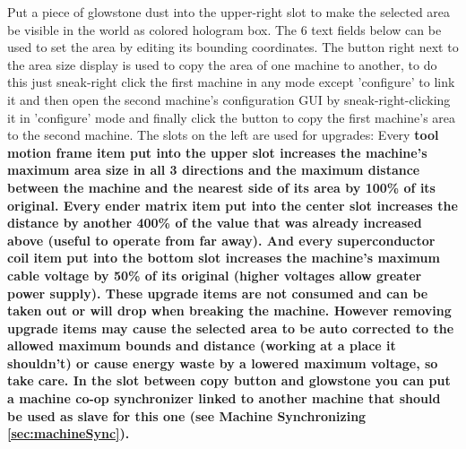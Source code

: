 \documentclass[11pt]{article} %
\begin{document}
Put a piece of glowstone dust into the upper-right slot to make the selected area be visible in the world as colored hologram box. The 6 text fields below can be used to set the area by editing its bounding coordinates. The button right next to the area size display is used to copy the area of one machine to another, to do this just sneak-right click the first machine in any mode except 'configure' to link it and then open the second machine's configuration GUI by sneak-right-clicking it in 'configure' mode and finally click the button to copy the first machine's area to the second machine. The slots on the left are used for upgrades: Every \bf tool motion frame \rm item put into the upper slot increases the machine's maximum area size in all 3 directions and the maximum distance between the machine and the nearest side of its area by 100\% of its original. Every \bf ender matrix \rm item put into the center slot increases the distance by another 400\% of the value that was already increased above (useful to operate from far away). And every \bf superconductor coil \rm item put into the bottom slot increases the machine's maximum cable voltage by 50\% of its original (higher voltages allow greater power supply). These upgrade items are not consumed and can be taken out or will drop when breaking the machine. However removing upgrade items may cause the selected area to be auto corrected to the allowed maximum bounds and distance (working at a place it shouldn't) or cause energy waste by a lowered maximum voltage, so take care. In the slot between copy button and glowstone you can put a \bf machine co-op synchronizer \rm linked to another machine that should be used as slave for this one (see Machine Synchronizing \ref{sec:machineSync}).
\end{document}
